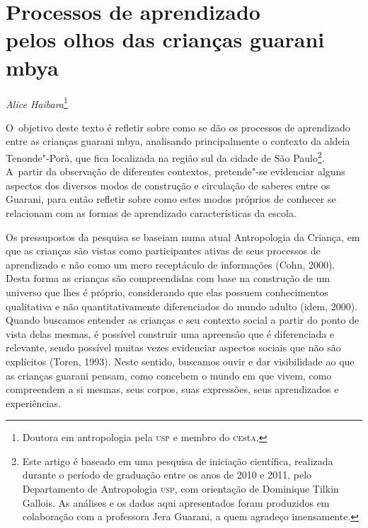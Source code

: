 \thispagestyle{empty}

\chapter*{Processos de aprendizado\\ pelos olhos das crianças guarani mbya}


\begin{flushright}
\emph{Alice Haibara}\footnote{Doutora em antropologia pela \textsc{usp} e membro do
\textsc{ce}st\textsc{a}.}
\end{flushright}

\noindent
O~objetivo deste texto é refletir sobre como se dão os processos de
aprendizado entre as crianças guarani mbya, analisando principalmente o
contexto da aldeia Tenonde"-Porã, que fica localizada na região sul da
cidade de São Paulo\footnote{Este artigo é baseado em uma pesquisa de
iniciação científica, realizada durante o período de graduação entre os
anos de 2010 e 2011, pelo Departamento de Antropologia \textsc{usp}, com
orientação de Dominique Tilkin Gallois. As análises e os dados aqui
apresentados foram produzidos em colaboração com a professora Jera
Guarani, a quem agradeço imensamente.}. A~partir da observação de
diferentes contextos, pretende"-se evidenciar alguns aspectos dos
diversos modos de construção e circulação de saberes entre os Guarani,
para então refletir sobre como estes modos próprios de conhecer se
relacionam com as formas de aprendizado características da escola.

Os pressupostos da pesquisa se baseiam numa atual Antropologia da
Criança, em que as crianças são vistas como participantes ativas de
seus processos de aprendizado e não como um mero receptáculo de
informações (Cohn, 2000). Desta forma as crianças são compreendidas com
base na construção de um universo que lhes é próprio, considerando que
elas possuem conhecimentos qualitativa e não quantitativamente
diferenciados do mundo adulto (idem, 2000). Quando buscamos entender as
crianças e seu contexto social a partir do ponto de vista delas mesmas,
é possível construir uma apreensão que é diferenciada e relevante,
sendo possível muitas vezes evidenciar aspectos sociais que não são
explícitos (Toren, 1993). Neste sentido, buscamos ouvir e dar
visibilidade ao que as crianças guarani pensam, como concebem o mundo
em que vivem, como compreendem a si mesmas, seus corpos, suas
expressões, seus aprendizados e experiências. 

